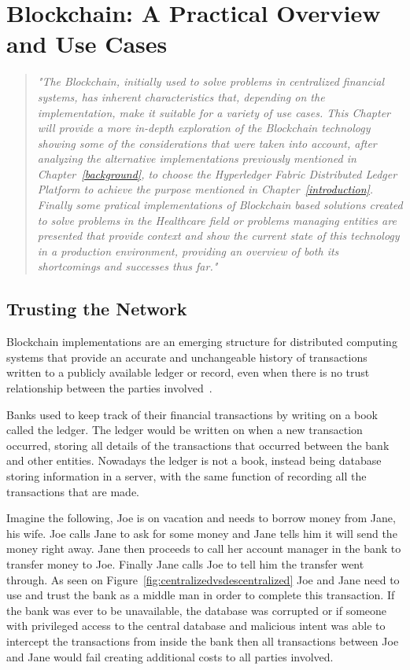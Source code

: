 \chapter{Blockchain: A Practical Overview and Use Cases}

\begin{quote} \emph{"The Blockchain, initially used to solve problems in
  centralized financial systems, has inherent characteristics that, depending
  on the implementation, make it suitable for a variety of use cases. This
  Chapter will provide a more in-depth exploration of the Blockchain technology
  showing some of the considerations that were taken into account, after
  analyzing the alternative implementations previously mentioned in
  Chapter~\ref{background}, to choose the Hyperledger Fabric Distributed Ledger
  Platform to achieve the purpose mentioned in Chapter~\ref{introduction}.
  Finally some pratical implementations of Blockchain based solutions created
  to solve problems in the Healthcare field or problems managing entities are
  presented that provide context and show the current state of this technology
  in a production environment, providing an overview of both its shortcomings
  and successes thus far."} \end{quote}

\section{Trusting the Network}

Blockchain implementations are an emerging structure for distributed computing
systems that provide an accurate and unchangeable history of transactions
written to a publicly available ledger or record, even when there is no trust
relationship between the parties involved~\cite{Barclay2017}.

Banks used to keep track of their financial transactions by writing on a book
called the ledger. The ledger would be written on when a new transaction
occurred, storing all details of the transactions that occurred between the bank
and other entities. Nowadays the ledger is not a book, instead being database storing information in a server, with the same function of recording all the transactions
that are made.

Imagine the following, Joe is on vacation and needs to borrow money from Jane,
his wife. Joe calls Jane to ask for some money and Jane tells him it will send
the money right away. Jane then proceeds to call her account manager in the
bank to transfer money to Joe. Finally Jane calls Joe to tell him the transfer
went through.  As seen on Figure~\ref{fig:centralizedvsdescentralized} Joe and
Jane need to use and trust the bank as a middle man in order to complete this
transaction. If the bank was ever to be unavailable, the database was corrupted
or if someone with  privileged access to the central database and malicious
intent was able to intercept the transactions from inside the bank then all
transactions between Joe and Jane would fail creating additional costs to all
parties involved. 

